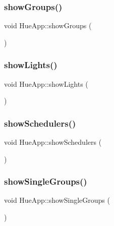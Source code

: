 \subsubsection{\texorpdfstring{show\+Groups()}{showGroups()}}
{\footnotesize\ttfamily void Hue\+App\+::show\+Groups (\begin{DoxyParamCaption}{ }\end{DoxyParamCaption})\hspace{0.3cm}{\ttfamily [private]}}

\mbox{\label{class_hue_app_a3f5ea7541b2a416acd0b9f4e94073e72}} 
\subsubsection{\texorpdfstring{show\+Lights()}{showLights()}}
{\footnotesize\ttfamily void Hue\+App\+::show\+Lights (\begin{DoxyParamCaption}{ }\end{DoxyParamCaption})\hspace{0.3cm}{\ttfamily [private]}}

\mbox{\label{class_hue_app_a889374816e88dddf42d7dc44732dbc3a}} 
\subsubsection{\texorpdfstring{show\+Schedulers()}{showSchedulers()}}
{\footnotesize\ttfamily void Hue\+App\+::show\+Schedulers (\begin{DoxyParamCaption}{ }\end{DoxyParamCaption})\hspace{0.3cm}{\ttfamily [private]}}

\mbox{\label{class_hue_app_a096902db63e23b1efb5756010af69209}} 
\subsubsection{\texorpdfstring{show\+Single\+Groups()}{showSingleGroups()}}
{\footnotesize\ttfamily void Hue\+App\+::show\+Single\+Groups (\begin{DoxyParamCaption}{ }\end{DoxyParamCaption})\hspace{0.3cm}{\ttfamily [private]}}



